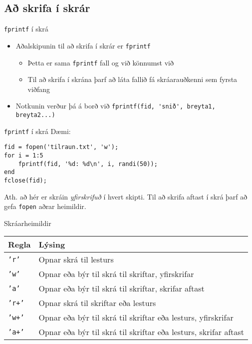 \documentclass{beamer}
\begin{document}
\subsection{Að skrifa í skrár}

\begin{frame}[fragile]{\texttt{fprintf} í skrá}
\begin{itemize}
 \item Aðalskipunin til að skrifa í skrár er \texttt{fprintf}
 \begin{itemize}
  \item Þetta er sama \texttt{fprintf} fall og við könnumst við
  \item Til að skrifa í skrána þarf að láta fallið fá skráarauðkenni sem fyrsta viðfang
 \end{itemize}
 \item Notkunin verður þá á borð við \verb|fprintf(fid, 'snið', breyta1, breyta2...)|
\end{itemize}
\end{frame}

\begin{frame}[fragile]{\texttt{fprintf} í skrá}
Dæmi:
\begin{verbatim}
fid = fopen('tilraun.txt', 'w');
for i = 1:5
    fprintf(fid, '%d: %d\n', i, randi(50));
end
fclose(fid);
\end{verbatim}
Ath. að hér er skráin \emph{yfirskrifuð} í hvert skipti. Til að skrifa aftast í skrá þarf að gefa \texttt{fopen} aðrar heimildir.
\end{frame}

\begin{frame}{Skráarheimildir}
\begin{center}
\begin{tabular}{ll}
\toprule
Regla&Lýsing\\
\midrule
\texttt{'r'}&Opnar skrá til lesturs\\
\texttt{'w'}&Opnar eða býr til skrá til skriftar, yfirskrifar\\
\texttt{'a'}&Opnar eða býr til skrá til skriftar, skrifar aftast\\
\texttt{'r+'}&Opnar skrá til skriftar eða lesturs\\
\texttt{'w+'}&Opnar eða býr til skrá til skriftar eða lesturs, yfirskrifar\\
\texttt{'a+'}&Opnar eða býr til skrá til skriftar eða lesturs, skrifar aftast\\
\bottomrule
\end{tabular}

\end{center}

\end{frame}
\end{document}
